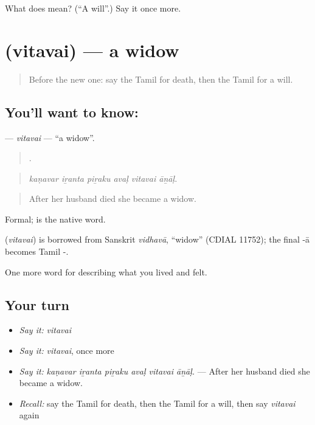 \begin{tcolorbox}[breakable,colback=teal!4,colframe=teal!35!black,title={Before you move on}]
What does  mean? (\textquotedblleft{}A will\textquotedblright{}.) Say it once more.
\end{tcolorbox}
\section[\texorpdfstring{\ta{விதவை} (vitavai)}{விதவை (vitavai)}]{ (vitavai) — a widow}

\label{lesson:TA-C505-vitavai}



\begin{quote}
Before the new one: say the Tamil for death, then the Tamil for a will.
\end{quote}

\subsection*{You'll want to know: }
\textbf{} — \emph{vitavai} — \textquotedblleft{}a widow\textquotedblright{}.

\begin{quote}
     .
\end{quote}

\begin{quote}
\emph{kaṇavar iṟanta piṟaku avaḷ vitavai āṉāḷ.}
\end{quote}

\begin{quote}
After her husband died she became a widow.
\end{quote}

Formal;  is the native word.

\begin{cousinweb}
\textbf{} (\emph{vitavai}) is borrowed from Sanskrit \emph{vidhavā}, \textquotedblleft{}widow\textquotedblright{} (CDIAL 11752); the final -ā becomes Tamil -.
\end{cousinweb}

\begin{grammarlens}[title={What you've built}]
One more word for describing what you lived and felt.
\end{grammarlens}

\subsection*{Your turn}
\begin{itemize}
\raggedright
  \item \emph{Say it:} \emph{vitavai}
  \item \emph{Say it:} \emph{vitavai}, once more
  \item \emph{Say it:} \emph{kaṇavar iṟanta piṟaku avaḷ vitavai āṉāḷ.} — After her husband died she became a widow.
  \item \emph{Recall:} say the Tamil for death, then the Tamil for a will, then say \emph{vitavai} again
\end{itemize}


